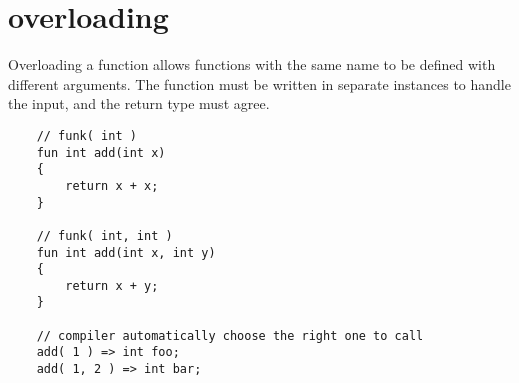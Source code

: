 \section{overloading}

Overloading a function allows functions with the same name to be defined with different arguments. The function must be written in separate instances to handle the input, and the return type must agree.
\begin{verbatim}
    // funk( int )
    fun int add(int x)
    {
        return x + x;
    }

    // funk( int, int )
    fun int add(int x, int y)
    {
        return x + y;
    }

    // compiler automatically choose the right one to call
    add( 1 ) => int foo;
    add( 1, 2 ) => int bar;
\end{verbatim}
